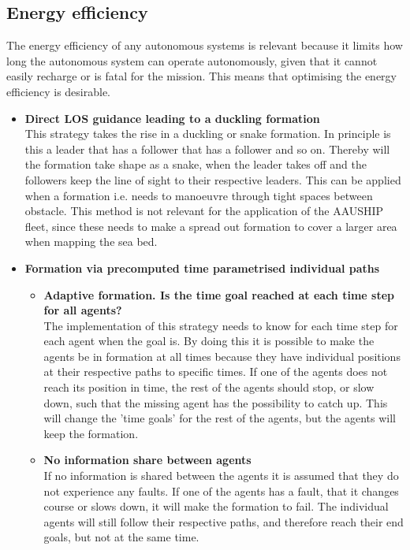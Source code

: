 \subsection{Energy efficiency}
The energy efficiency of any autonomous systems is relevant because it limits how long the autonomous system can operate autonomously, given that it cannot easily recharge or is fatal for the mission. This means that optimising the energy efficiency is desirable.

\begin{itemize}
\item \textbf{Direct LOS guidance leading to a duckling formation}\\
This strategy takes the rise in a duckling or snake formation. In principle is this a leader that has a follower that has a follower and so on. Thereby will the formation take shape as a snake, when the leader takes off and the followers keep the line of sight to their respective leaders. This can be applied when a formation i.e. needs to manoeuvre through tight spaces between obstacle. This method is not relevant for the application of the AAUSHIP fleet, since these needs to make a spread out formation to cover a larger area when mapping the sea bed.
\item \textbf{Formation via precomputed time parametrised individual paths}
	\begin{itemize}
	\item \textbf{Adaptive formation. Is the time goal reached at each time step for all agents?}\\
	The implementation of this strategy needs to know for each time step for each agent when the goal is. By doing this it is possible to make the agents be in formation at all times because they have individual positions at their respective paths to specific times. If one of the agents does not reach its position in time, the rest of the agents should stop, or slow down, such that the missing agent has the possibility to catch up. This will change the 'time goals' for the rest of the agents, but the agents will keep the formation.
	\item \textbf{No information share between agents}\\
	If no information is shared between the agents it is assumed that they do not experience any faults. If one of the agents has a fault, that it changes course or slows down, it will make the formation to fail. The individual agents will still follow their respective paths, and therefore reach their end goals, but not at the same time.

\end{itemize}
\end{itemize}
